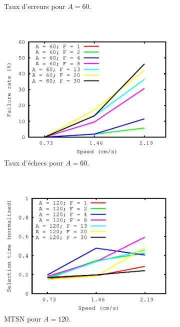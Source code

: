 \begin{figure}[!htb]
\begin{subfigure}[t]{\subImgWlineplot}
			\caption{Taux d'erreurs pour $A = 60$.}
			\label{fig:spEffect_e_60}
		\end{subfigure}
		~
		\begin{subfigure}[t]{\subImgWlineplot}
			\centering
			\includegraphics[width=\textwidth]{figures/ch4/speed_angle_60_failures}
			\caption{Taux d'échecs pour $A = 60$.}
			\label{fig:spEffect_f_60}
		\end{subfigure}
		~
		\begin{subfigure}[t]{\subImgWlineplot}
			\centering
			\includegraphics[width=\textwidth]{figures/ch4/speed_angle_120_times}
			\caption{MTSN pour $A = 120$.}
			\label{fig:spEffect_t_120}
		\end{subfigure}
		~
		\begin{subfigure}[t]{\subImgWlineplot}
			\centering

\end{subfigure}
\end{figure}
